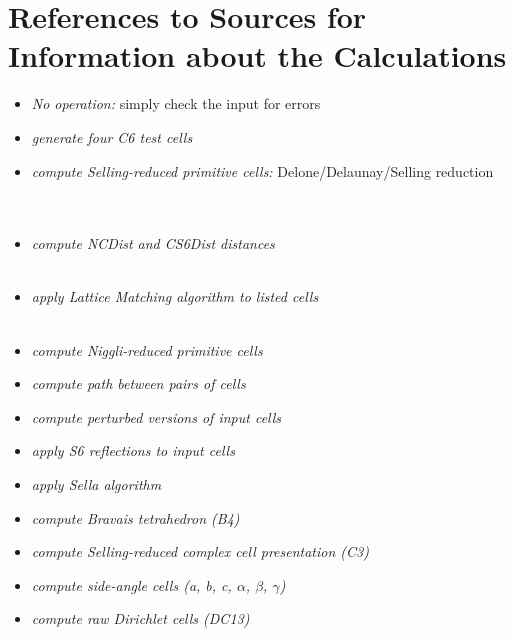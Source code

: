 \documentclass[preprint]{iucr}              %
\numberwithin{equation}{section}
\begin{document}
	\section{References to Sources for Information about the Calculations}
\begin{itemize}
	\item 	\emph{No operation:} simply check the input for errors
	\item 	\emph{generate four C6 test cells}
	\item 	\emph{compute Selling-reduced primitive cells:} Delone/Delaunay/Selling reduction \\
	\cite{Delaunay1932}\\
	\cite{Delone1975}\\
	\cite{Andrews2019a}
	\item 	\emph{compute NCDist and CS6Dist distances}\\
	\cite{Andrews2014}\\
	\cite{Andrews2019b}
	\item \emph{	apply Lattice Matching algorithm to listed cells}\\
	\cite{Mighell2002}\\
	\cite{andrews2021approximate}
	\item 	\emph{compute Niggli-reduced primitive cells}\\
	\cite{Niggli1928}
	\cite{Gruber1973}
	\item 	\emph{compute path between pairs of cells}\\
	\cite{andrews2023follower}
	\item 	\emph{compute perturbed versions of input cells}\\
	\cite{andrews2022generating}
	\item 	\emph{apply S6 reflections to input cells}\\
	\cite{Andrews2019b}
	\item 	\emph{apply Sella algorithm}\\
	\cite{andrews2023sella}
	\item 	\emph{compute Bravais tetrahedron (B4)}\\
	\cite{Delone1975}
	\item 	\emph{compute Selling-reduced complex cell presentation (C3)}\\
	\cite{Andrews2019b}
	\item 	\emph{compute side-angle cells (a, b, c, $\alpha$, $\beta$, $\gamma$)}
	\item 	\emph{compute raw Dirichlet cells (DC13)}\\

\end{itemize}
\end{document}
